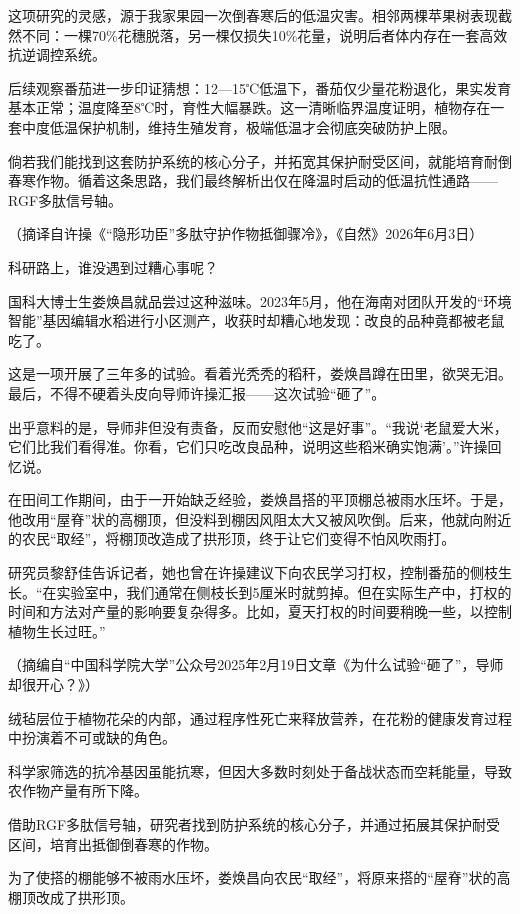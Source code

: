 \documentclass[11pt,a4paper]{ctexart}
\begin{document}
\begin{materialtext}
这项研究的灵感，源于我家果园一次倒春寒后的低温灾害。相邻两棵苹果树表现截然不同：一棵70\%花穗脱落，另一棵仅损失10\%花量，说明后者体内存在一套高效抗逆调控系统。

后续观察番茄进一步印证猜想：12—15℃低温下，番茄仅少量花粉退化，果实发育基本正常；温度降至8℃时，育性大幅暴跌。这一清晰临界温度证明，植物存在一套中度低温保护机制，维持生殖发育，极端低温才会彻底突破防护上限。

倘若我们能找到这套防护系统的核心分子，并拓宽其保护耐受区间，就能培育耐倒春寒作物。循着这条思路，我们最终解析出仅在降温时启动的低温抗性通路——RGF多肽信号轴。
\end{materialtext}
\begin{flushright}（摘译自许操《“隐形功臣”多肽守护作物抵御骤冷》，《自然》2026年6月3日）\end{flushright}

\begin{materialtext}
科研路上，谁没遇到过糟心事呢？

国科大博士生娄焕昌就品尝过这种滋味。2023年5月，他在海南对团队开发的“环境智能”基因编辑水稻进行小区测产，收获时却糟心地发现：改良的品种竟都被老鼠吃了。

这是一项开展了三年多的试验。看着光秃秃的稻秆，娄焕昌蹲在田里，欲哭无泪。最后，不得不硬着头皮向导师许操汇报——这次试验“砸了”。

出乎意料的是，导师非但没有责备，反而安慰他“这是好事”。“我说‘老鼠爱大米，它们比我们看得准。你看，它们只吃改良品种，说明这些稻米确实饱满’。”许操回忆说。

在田间工作期间，由于一开始缺乏经验，娄焕昌搭的平顶棚总被雨水压坏。于是，他改用“屋脊”状的高棚顶，但没料到棚因风阻太大又被风吹倒。后来，他就向附近的农民“取经”，将棚顶改造成了拱形顶，终于让它们变得不怕风吹雨打。

研究员黎舒佳告诉记者，她也曾在许操建议下向农民学习打权，控制番茄的侧枝生长。“在实验室中，我们通常在侧枝长到5厘米时就剪掉。但在实际生产中，打权的时间和方法对产量的影响要复杂得多。比如，夏天打权的时间要稍晚一些，以控制植物生长过旺。”
\end{materialtext}
\begin{flushright}（摘编自“中国科学院大学”公众号2025年2月19日文章《为什么试验“砸了”，导师却很开心？》）\end{flushright}

\begin{choices}
\item 绒毡层位于植物花朵的内部，通过程序性死亡来释放营养，在花粉的健康发育过程中扮演着不可或缺的角色。
\item 科学家筛选的抗冷基因虽能抗寒，但因大多数时刻处于备战状态而空耗能量，导致农作物产量有所下降。
\item 借助RGF多肽信号轴，研究者找到防护系统的核心分子，并通过拓展其保护耐受区间，培育出抵御倒春寒的作物。
\item 为了使搭的棚能够不被雨水压坏，娄焕昌向农民“取经”，将原来搭的“屋脊”状的高棚顶改成了拱形顶。
\end{choices}
\end{document}
